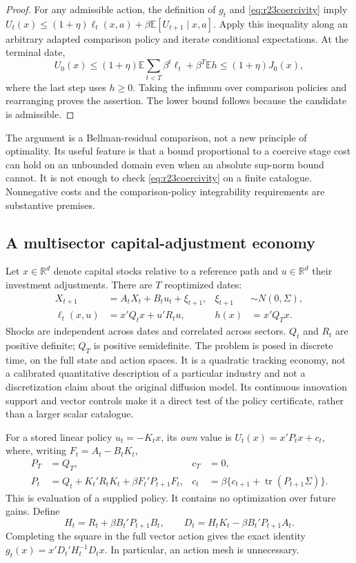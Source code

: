 \documentclass[ecta,nameyear,draft]{econsocart}
\theoremstyle{definition}
\theoremstyle{remark}
\newcommand{\E}{\mathbb E}
\newcommand{\R}{\mathbb R}
\newcommand{\tr}{\operatorname{tr}}
\begin{document}
\begin{proof}
For any admissible action, the definition of $g_t$ and
\eqref{eq:r23coercivity} imply
$U_t(x)\leq(1+\eta)\ell_t(x,a)+\beta\E[U_{t+1}\mid x,a]$.
Apply this inequality along an arbitrary adapted comparison policy and
iterate conditional expectations. At the terminal date,
\[
 U_0(x)\leq(1+\eta)\E\sum_{t<T}\beta^t\ell_t
                 +\beta^T\E h\leq(1+\eta)J_0(x),
\]
where the last step uses $h\geq0$. Taking the infimum over comparison
policies and rearranging proves the assertion. The lower bound follows
because the candidate is admissible.
\end{proof}

The argument is a Bellman-residual comparison, not a new principle of
optimality. Its useful feature is that a bound proportional to a coercive
stage cost can hold on an unbounded domain even when an absolute sup-norm
bound cannot. It is not enough to check \eqref{eq:r23coercivity} on a finite
catalogue. Nonnegative costs and the comparison-policy integrability
requirements are substantive premises.

\subsection{A multisector capital-adjustment economy}
Let $x\in\R^d$ denote capital stocks relative to a reference path and
$u\in\R^d$ their investment adjustments. There are $T$ reoptimized dates:
\begin{align}
 X_{t+1}&=A_tX_t+B_tu_t+\xi_{t+1},&
 \xi_{t+1}&\sim N(0,\Sigma),\label{eq:r23dynamics}\\
 \ell_t(x,u)&=x'Q_tx+u'R_tu,&h(x)&=x'Q_Tx.\label{eq:r23cost}
\end{align}
Shocks are independent across dates and correlated across sectors.
$Q_t$ and $R_t$ are positive definite; $Q_T$ is positive semidefinite.
The problem is posed in discrete time, on the full state and action spaces.
It is a quadratic tracking economy, not a calibrated quantitative description
of a particular industry and not a discretization claim about the original
diffusion model. Its continuous innovation support and vector controls make
it a direct test of the policy certificate, rather than a larger scalar
catalogue.

For a stored linear policy $u_t=-K_tx$, its \emph{own} value is
$U_t(x)=x'P_tx+c_t$, where, writing $F_t=A_t-B_tK_t$,
\begin{align}
 P_T&=Q_T,&c_T&=0,\nonumber\\
 P_t&=Q_t+K_t'R_tK_t+\beta F_t'P_{t+1}F_t,&
 c_t&=\beta\{c_{t+1}+\tr(P_{t+1}\Sigma)\}.
 \label{eq:r23evaluation}
\end{align}
This is evaluation of a supplied policy. It contains no optimization over
future gains. Define
\begin{equation}
 H_t=R_t+\beta B_t'P_{t+1}B_t,\qquad
 D_t=H_tK_t-\beta B_t'P_{t+1}A_t.
 \label{eq:r23residual}
\end{equation}
Completing the square in the full vector action gives the exact identity
$g_t(x)=x'D_t'H_t^{-1}D_tx$. In particular, an action mesh is unnecessary.
\end{document}
